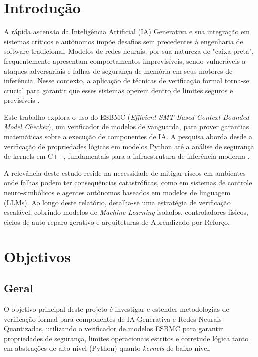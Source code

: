 \chapter{Introdução}

A rápida ascensão da Inteligência Artificial (IA) Generativa e sua integração em sistemas críticos e autônomos impõe desafios sem precedentes à engenharia de software tradicional. Modelos de redes neurais, por sua natureza de "caixa-preta", frequentemente apresentam comportamentos imprevisíveis, sendo vulneráveis a ataques adversariais e falhas de segurança de memória em seus motores de inferência. Nesse contexto, a aplicação de técnicas de verificação formal torna-se crucial para garantir que esses sistemas operem dentro de limites seguros e previsíveis \cite{huang2017robustness}.

Este trabalho explora o uso do ESBMC (\textit{Efficient SMT-Based Context-Bounded Model Checker}), um verificador de modelos de vanguarda, para prover garantias matemáticas sobre a execução de componentes de IA. A pesquisa aborda desde a verificação de propriedades lógicas em modelos Python até a análise de segurança de kernels em C++, fundamentais para a infraestrutura de inferência moderna \cite{gopinath2021verifying}.

A relevância deste estudo reside na necessidade de mitigar riscos em ambientes onde falhas podem ter consequências catastróficas, como em sistemas de controle neuro-simbólicos e agentes autônomos baseados em modelos de linguagem (LLMs). Ao longo deste relatório, detalha-se uma estratégia de verificação escalável, cobrindo modelos de \textit{Machine Learning} isolados, controladores físicos, ciclos de auto-reparo gerativo e arquiteturas de Aprendizado por Reforço.

\chapter{Objetivos}

\section{Geral}

O objetivo principal deste projeto é investigar e estender metodologias de verificação formal para componentes de IA Generativa e Redes Neurais Quantizadas, utilizando o verificador de modelos ESBMC para garantir propriedades de segurança, limites operacionais estritos e corretude lógica tanto em abstrações de alto nível (Python) quanto \textit{kernels} de baixo nível.

